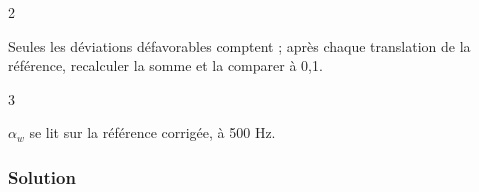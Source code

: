 \documentclass[11pt,a4paper]{article}
\begin{document}
\begin{indication}{2}

Seules les déviations défavorables comptent ; après chaque translation de la référence, recalculer la somme et la comparer à 0,1.

\end{indication}

\begin{indication}{3}

\(\alpha_w\) se lit sur la référence corrigée, à 500 Hz.

\end{indication}

\hypertarget{solution-41}{%
\subsubsection{Solution}\label{solution-41}}
\end{document}
